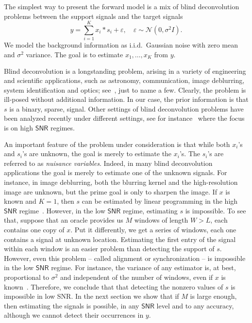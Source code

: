 \documentclass[english,11pt]{article}
\numberwithin{equation}{section}
\theoremstyle{plain}
\theoremstyle{definition}
\theoremstyle{remark}
\theoremstyle{plain}
\theoremstyle{remark}
\theoremstyle{plain}
\theoremstyle{plain}
\newcommand{\SNR}{{\textsf{SNR}}}
\begin{document}
The simplest way to present the forward model is a mix of blind deconvolution problems between the support signals and the target signals
\begin{equation}
y = \sum_{i=1}^K x_i\ast s_i + \varepsilon,\quad \varepsilon\sim\mathcal{N}(0,\sigma^2 I).
\end{equation}
We model the background information as i.i.d.\ Gaussian noise with zero mean and $\sigma^2$ variance. 
The goal is to estimate $x_1,\ldots,x_K$ from $y$.

Blind deconvolution is a longstanding problem, arising in a variety of engineering and scientific applications, such as astronomy, communication, image deblurring, system identification and optics; see~\cite{jefferies1993restoration,shalvi1990new,ayers1988iterative,abed1997blind}, just to name a few. Clearly, the problem is ill-posed without additional information. In our case, the prior information is that $s$ is a binary, sparse, signal. 
Other settings of blind deconvolution problems have been analyzed recently under different settings, see for instance~\cite{ahmed2014blind,li2016identifiability,li2016rapid,ling2015self,ling2017blind,chi2016guaranteed}
where the focus is on high $\SNR$ regimes.


An important feature of the problem under consideration is that while both $x_i$'s and $s_i$'s are unknown, the goal is merely to estimate the $x_i$'s. The  $s_i$'s  are referred to as \emph{nuisance  variables}. Indeed, in many blind deconvolution applications the goal is merely to estimate one of the unknown signals. For instance, in image deblurring, both the blurring
kernel and the high-resolution image are unknown, but the prime goal is only
to sharpen the image.
If $x$ is known and $K=1$, then  $s$ can be estimated by linear programming  in the high $\SNR$ regime~\cite{de2012exact,duval2015exact,bendory2016robust,bendory2017robust,bernstein2017deconvolution}. However, in the low $\SNR$ regime, estimating $s$ is impossible. To see that, suppose that an oracle provides us $M$ windows of length $W>L$, each contains one copy of $x$. Put it differently, we get a series of windows, each one contains a signal at unknown location. 
Estimating the first entry of the signal within each  window is an easier problem than detecting the support of $s$. However, even this problem -- called alignment or synchronization -- is impossible in the low $\SNR$ regime.
For instance, the variance of any estimator is, at best, proportional to $\sigma^2$ and independent of the number of windows, even if $x$ is known~\cite{aguerrebere2016fundamental}. Therefore, we conclude that that detecting the nonzero values of $s$ is impossible in low \SNR. 
In the next section we show that if $M$ is large enough, then estimating the signals is possible, in any $\SNR$ level and to any accuracy, although we cannot detect their occurrences in $y$. 
\end{document}
